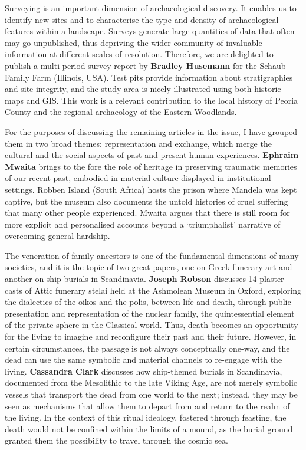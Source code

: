 Surveying is an important dimension of archaeological discovery. It enables us to identify new sites and to characterise the type and density of archaeological features within a landscape. Surveys generate large quantities of data that often may go unpublished, thus depriving the wider community of invaluable information at different scales of resolution. Therefore, we are delighted to publish a multi-period survey report by \textbf{Bradley Husemann} for the Schaub Family Farm (Illinois, USA). Test pits provide information about stratigraphies and site integrity, and the study area is nicely illustrated using both historic maps and GIS. This work is a relevant contribution to the local history of Peoria County and the regional archaeology of the Eastern Woodlands.

For the purposes of discussing the remaining articles in the issue, I have grouped them in two broad themes: representation and exchange, which merge the cultural and the social aspects of past and present human experiences. \textbf{Ephraim Mwaita} brings to the fore the role of heritage in preserving traumatic memories of our recent past, embodied in material culture displayed in institutional settings. Robben Island (South Africa) hosts the prison where Mandela was kept captive, but the museum also documents the untold histories of cruel suffering that many other people experienced. Mwaita argues that there is still room for more explicit and personalised accounts beyond a \enquote*{triumphalist} narrative of overcoming general hardship.

The veneration of family ancestors is one of the fundamental dimensions of many societies, and it is the topic of two great papers, one on Greek funerary art and another on ship burials in Scandinavia. \textbf{Joseph Robson} discusses 14 plaster casts of Attic funerary stelai held at the Ashmolean Museum in Oxford, exploring the dialectics of the oikos and the polis, between life and death, through public presentation and representation of the nuclear family, the quintessential element of the private sphere in the Classical world. Thus, death becomes an opportunity for the living to imagine and reconfigure their past and their future. However, in certain circumstances, the passage is not always conceptually one-way, and the dead can use the same symbolic and material channels to re-engage with the living. \textbf{Cassandra Clark} discusses how ship-themed burials in Scandinavia, documented from the Mesolithic to the late Viking Age, are not merely symbolic vessels that transport the dead from one world to the next; instead, they may be seen as mechanisms that allow them to depart from and return to the realm of the living. In the context of this ritual ideology, fostered through feasting, the death would not be confined within the limits of a mound, as the burial ground granted them the possibility to travel through the cosmic sea.

